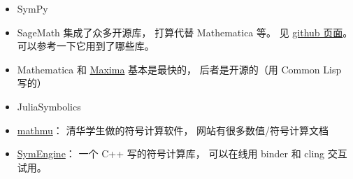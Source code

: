 
\begin{issues}
\issueDraft
\end{issues}

\begin{itemize}
\item SymPy
\item SageMath 集成了众多开源库， 打算代替 Mathematica 等。 见 \href{https://github.com/sagemath/sage/}{github 页面}。 可以参考一下它用到了哪些库。
\item Mathematica 和 \href{https://maxima.sourceforge.io/}{Maxima} 基本是最快的， 后者是开源的（用 Common Lisp 写的）
\item JuliaSymbolics
\item \href{http://mathmu.github.io/MTCAS/RecentChanges.html}{mathmu}： 清华学生做的符号计算软件， 网站有很多数值/符号计算文档
\item \href{https://github.com/symengine/symengine}{SymEngine}： 一个 C++ 写的符号计算库， 可以在线用 binder 和 cling 交互试用。
\end{itemize}
